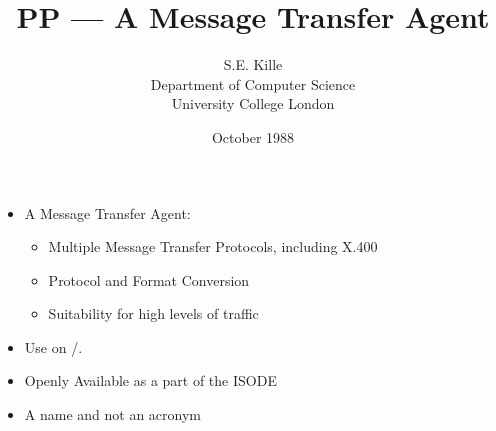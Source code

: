 
\title {PP --- A Message Transfer Agent}

\author {S.E. Kille \\
Department of Computer Science \\
University College London}

\date {October 1988}
\raggedright



\maketitlepage

\begin {bwslide}

\begin {itemize}
\item A Message Transfer Agent:

\begin {itemize}
\item Multiple Message Transfer Protocols, including X.400
\item Protocol and Format Conversion
\item Suitability for high levels of traffic
\end {itemize}
\item Use on \unix/.
\item Openly Available as a part of the ISODE
\item A name and not an acronym
\end {itemize}


\end {bwslide}

